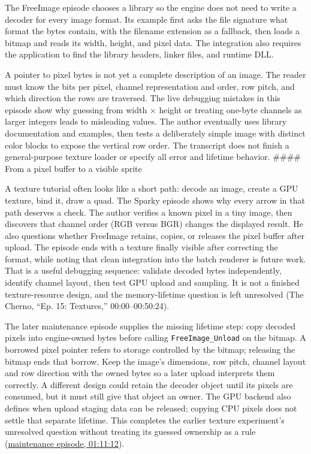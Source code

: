 \hypertarget{06-engine-ii-ch027-loading-image-data-means-interpreting-its-layout}{}

The FreeImage episode chooses a library so the engine does not need to write a decoder for every image format. Its example first asks the file signature what format the bytes contain, with the filename extension as a fallback, then loads a bitmap and reads its width, height, and pixel data. The integration also requires the application to find the library headers, linker files, and runtime DLL.

A pointer to pixel bytes is not yet a complete description of an image. The reader must know the bits per pixel, channel representation and order, row pitch, and which direction the rows are traversed. The live debugging mistakes in this episode show why guessing from width × height or treating one-byte channels as larger integers leads to misleading values. The author eventually uses library documentation and examples, then tests a deliberately simple image with distinct color blocks to expose the vertical row order. The transcript does not finish a general-purpose texture loader or specify all error and lifetime behavior. \#\#\#\# From a pixel buffer to a visible sprite

A texture tutorial often looks like a short path: decode an image, create a GPU texture, bind it, draw a quad. The Sparky episode shows why every arrow in that path deserves a check. The author verifies a known pixel in a tiny image, then discovers that channel order (RGB versus BGR) changes the displayed result. He also questions whether FreeImage retains, copies, or releases the pixel buffer after upload. The episode ends with a texture finally visible after correcting the format, while noting that clean integration into the batch renderer is future work. That is a useful debugging sequence: validate decoded bytes independently, identify channel layout, then test GPU upload and sampling. It is not a finished texture-resource design, and the memory-lifetime question is left unresolved (The Cherno, ``Ep. 15: Textures,'' 00:00--00:50:24).

The later maintenance episode supplies the missing lifetime step: copy decoded pixels into engine-owned bytes before calling \texttt{FreeImage\_Unload} on the bitmap. A borrowed pixel pointer refers to storage controlled by the bitmap; releasing the bitmap ends that borrow. Keep the image's dimensions, row pitch, channel layout and row direction with the owned bytes so a later upload interprets them correctly. A different design could retain the decoder object until its pixels are consumed, but it must still give that object an owner. The GPU backend also defines when upload staging data can be released; copying CPU pixels does not settle that separate lifetime. This completes the earlier texture experiment's unresolved question without treating its guessed ownership as a rule (\href{https://www.youtube.com/watch?v=CKhGMoTNPOo&t=4272}{maintenance episode, 01:11:12}).

